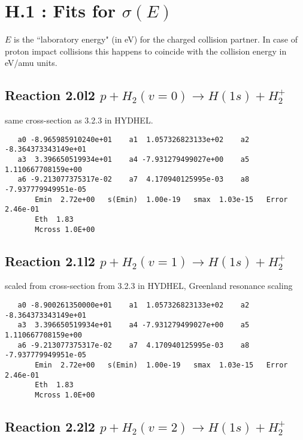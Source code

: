 \documentclass[12pt,dvipdfmx]{article}
\begin{document}
\section{H.1 :  Fits for $\sigma(E) $}

$E$ is the ``laboratory energy" (in eV) for the charged collision
partner. In case of proton impact collisions this happens to
coincide with the collision energy in eV/amu units.

\subsection{
Reaction 2.0l2 $   p + H_2(v=0) \rightarrow H(1s) + H_2^+$}

same cross-section as 3.2.3 in HYDHEL.

\begin{small}\begin{verbatim}
   a0 -8.965985910240e+01    a1  1.057326823133e+02    a2 -8.364373343149e+01
   a3  3.396650519934e+01    a4 -7.931279499027e+00    a5  1.110667708159e+00
   a6 -9.213077375317e-02    a7  4.170940125995e-03    a8 -7.937779949951e-05
       Emin  2.72e+00   s(Emin)  1.00e-19   smax  1.03e-15   Error  2.46e-01
       Eth  1.83
       Mcross 1.0E+00
\end{verbatim}\end{small}

\subsection{
Reaction 2.1l2 $   p + H_2(v=1) \rightarrow H(1s) + H_2^+$}

scaled from cross-section from 3.2.3 in HYDHEL, Greenland resonance scaling

\begin{small}\begin{verbatim}
   a0 -8.900261350000e+01    a1  1.057326823133e+02    a2 -8.364373343149e+01
   a3  3.396650519934e+01    a4 -7.931279499027e+00    a5  1.110667708159e+00
   a6 -9.213077375317e-02    a7  4.170940125995e-03    a8 -7.937779949951e-05
       Emin  2.72e+00   s(Emin)  1.00e-19   smax  1.03e-15   Error  2.46e-01
       Eth  1.83
       Mcross 1.0E+00
\end{verbatim}\end{small}
\subsection{
Reaction 2.2l2 $   p + H_2(v=2) \rightarrow H(1s) + H_2^+$}
\end{document}
